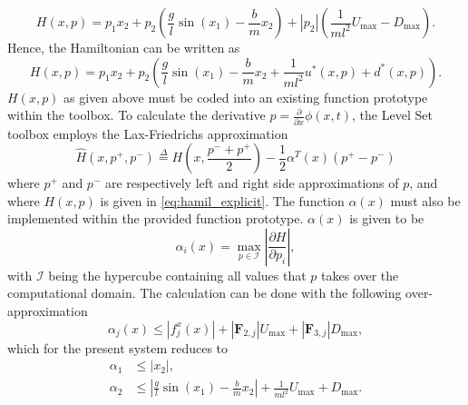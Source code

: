 \documentclass[../main.tex]{subfiles}
\begin{document}
\begin{equation}\label{eq:hamil_explicit}
    H(x,p) = p_1x_2+p_2\left(\frac{g}{l}\sin(x_1)-\frac{b}{m}x_2\right)+|p_2|\left(\frac{1}{ml^2}U_{\text{max}}-D_{\text{max}}\right).
\end{equation}
\fi
Hence, the Hamiltonian can be written as
\begin{equation}\label{eq:hamil_explicit}
    H(x,p) = p_1x_2+p_2\left(\frac{g}{l}\sin(x_1)-\frac{b}{m}x_2+\frac{1}{ml^2}u^*(x,p)+d^*(x,p)\right).
\end{equation}
$H(x,p)$ as given above must be coded into an existing function prototype within the toolbox.
To calculate the derivative $p = \frac{\partial}{\partial x} \phi(x,t)$, the Level Set toolbox employs the Lax-Friedrichs approximation 
\begin{equation}
    \widehat{H}(x,p^+,p^-) \overset{\Delta}{=} H\left(x,\frac{p^-+p^+}{2}\right) - \frac{1}{2} \alpha^T(x)(p^+-p^-)
\end{equation}
where $p^+$ and $p^-$ are respectively left and right side approximations of $p$, and where $H(x,p)$ is given in \eqref{eq:hamil_explicit}. The function $\alpha(x)$ must also be implemented within the provided function prototype. $\alpha(x)$ is given to be
\begin{equation}
    \alpha_i(x) = \max_{p\in\mathcal{I}} \left|\frac{\partial H}{\partial p_i}\right|,
\end{equation}
with $\mathcal{I}$ being the hypercube containing all values that $p$ takes over the computational domain. The calculation can be done with the following over-approximation
\begin{equation}
    \alpha_j(x) \leq |f_j^x(x)| + |\textbf{F}_{2,j}|U_{\text{max}} + |\textbf{F}_{3,j}|D_{\text{max}}, 
\end{equation}
which for the present system reduces to 
\begin{align}
    \alpha_1 &\leq |x_2|,\\
    \alpha_2 &\leq \left|\frac{g}{l}\sin(x_1)-\frac{b}{m}x_2\right| + \frac{1}{ml^2}U_{\text{max}} + D_{\text{max}}.
\end{align}
\end{document}
